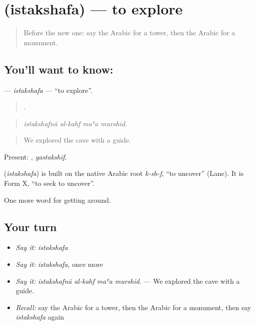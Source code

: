 \section[\texorpdfstring{\ar{استكشف} (istakshafa)}{استكشف (istakshafa)}]{ (istakshafa) — to explore}

\label{lesson:AR-C439-istakshafa}



\begin{quote}
Before the new one: say the Arabic for a tower, then the Arabic for a monument.
\end{quote}

\subsection*{You'll want to know: }
\textbf{} — \emph{istakshafa} — \textquotedblleft{}to explore\textquotedblright{}.

\begin{quote}
   .
\end{quote}

\begin{quote}
\emph{istakshafnā al-kahf maʿa murshid.}
\end{quote}

\begin{quote}
We explored the cave with a guide.
\end{quote}

Present: , \emph{yastakshif}.

\begin{cousinweb}
\textbf{} (\emph{istakshafa}) is built on the native Arabic root \emph{k-sh-f}, \textquotedblleft{}to uncover\textquotedblright{} (Lane). It is Form X, \textquotedblleft{}to seek to uncover\textquotedblright{}.
\end{cousinweb}

\begin{grammarlens}[title={What you've built}]
One more word for getting around.
\end{grammarlens}

\subsection*{Your turn}
\begin{itemize}
\raggedright
  \item \emph{Say it:} \emph{istakshafa}
  \item \emph{Say it:} \emph{istakshafa}, once more
  \item \emph{Say it:} \emph{istakshafnā al-kahf maʿa murshid.} — We explored the cave with a guide.
  \item \emph{Recall:} say the Arabic for a tower, then the Arabic for a monument, then say \emph{istakshafa} again
\end{itemize}


